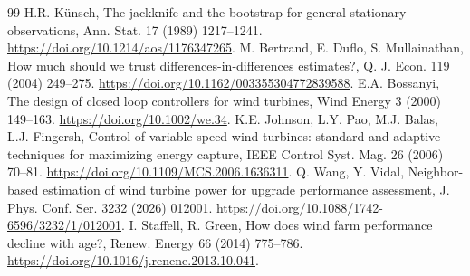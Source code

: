 \documentclass[preprint,12pt]{elsarticle}
\begin{document}
\begin{thebibliography}{99}
 H.R. Künsch, The jackknife and the bootstrap for general stationary observations, Ann. Stat. 17 (1989) 1217--1241. \url{https://doi.org/10.1214/aos/1176347265}.
 M. Bertrand, E. Duflo, S. Mullainathan, How much should we trust differences-in-differences estimates?, Q. J. Econ. 119 (2004) 249--275. \url{https://doi.org/10.1162/003355304772839588}.
 E.A. Bossanyi, The design of closed loop controllers for wind turbines, Wind Energy 3 (2000) 149--163. \url{https://doi.org/10.1002/we.34}.
 K.E. Johnson, L.Y. Pao, M.J. Balas, L.J. Fingersh, Control of variable-speed wind turbines: standard and adaptive techniques for maximizing energy capture, IEEE Control Syst. Mag. 26 (2006) 70--81. \url{https://doi.org/10.1109/MCS.2006.1636311}.
 Q. Wang, Y. Vidal, Neighbor-based estimation of wind turbine power for upgrade performance assessment, J. Phys. Conf. Ser. 3232 (2026) 012001. \url{https://doi.org/10.1088/1742-6596/3232/1/012001}.
 I. Staffell, R. Green, How does wind farm performance decline with age?, Renew. Energy 66 (2014) 775--786. \url{https://doi.org/10.1016/j.renene.2013.10.041}.
\end{thebibliography}
\end{document}

